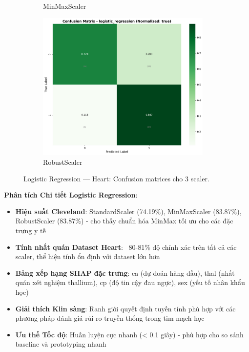 \begin{figure}[H]
\begin{subfigure}[b]{0.31\textwidth}
\caption{MinMaxScaler}\label{fig:logreg_heart_cm_minmax}
\end{subfigure}\hfill
\begin{subfigure}[b]{0.31\textwidth}\centering
\includegraphics[width=0.95\textwidth]{Result/heart_dataset/confusion_matrices/logistic_regression_numeric_dataset_RobustScaler.png}
\caption{RobustScaler}\label{fig:logreg_heart_cm_robust}
\end{subfigure}
\caption{Logistic Regression — Heart: Confusion matrices cho 3 scaler.}
\label{fig:logreg_heart_confusions}
\end{figure}

\textbf{Phân tích Chi tiết Logistic Regression}:
\begin{itemize}
    \item \textbf{Hiệu suất Cleveland}: StandardScaler (74.19\%), MinMaxScaler (83.87\%), RobustScaler (83.87\%) - cho thấy chuẩn hóa MinMax tối ưu cho các đặc trưng y tế
    \item \textbf{Tính nhất quán Dataset Heart}: ~80-81\% độ chính xác trên tất cả các scaler, thể hiện tính ổn định với dataset lớn hơn
    \item \textbf{Bảng xếp hạng SHAP đặc trưng}: ca (dự đoán hàng đầu), thal (nhất quán xét nghiệm thallium), cp (độ tin cậy đau ngực), sex (yếu tố nhân khẩu học)
    \item \textbf{Giải thích Klin sàng}: Ranh giới quyết định tuyến tính phù hợp với các phương pháp đánh giá rủi ro truyền thống trong tim mạch học
    \item \textbf{Ưu thế Tốc độ}: Huấn luyện cực nhanh (< 0.1 giây) - phù hợp cho so sánh baseline và prototyping nhanh
\end{itemize}

